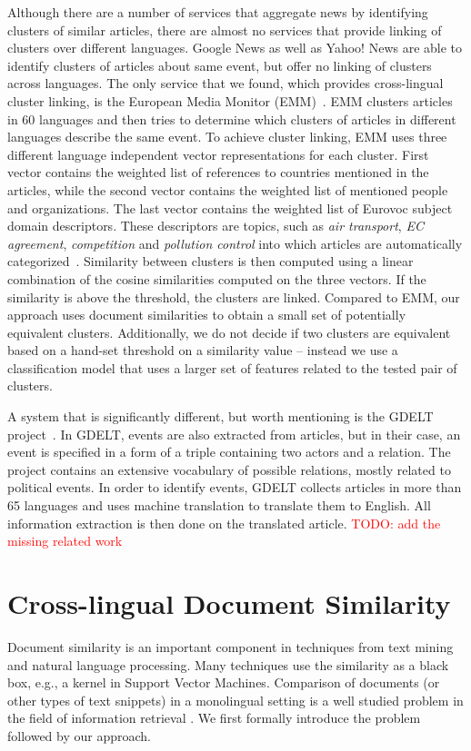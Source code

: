 \documentclass[twoside,11pt]{article}
\newcommand{\todo}[1]{\textcolor{red}{TODO: #1}}
\begin{document}
Although there are a number of services that aggregate news by identifying clusters of similar articles, there are almost no services that provide linking of clusters over different languages. Google News as well as Yahoo! News are able to identify clusters of articles about same event, but offer no linking of clusters across languages. The only service that we found, which provides cross-lingual cluster linking, is the European Media Monitor (EMM)~\cite{pouliquen2008story,Steinberger2008}. EMM clusters articles in 60 languages and then tries to determine which clusters of articles in different languages describe the same event. To achieve cluster linking, EMM uses three different language independent vector representations for each cluster. First vector contains the weighted list of references to countries mentioned in the articles, while the second vector contains the weighted list of mentioned people and organizations. The last vector contains the weighted list of Eurovoc subject domain descriptors. These descriptors are topics, such as \emph{air transport}, \emph{EC agreement}, \emph{competition} and \emph{pollution control} into which articles are automatically categorized~. Similarity between clusters is then computed using a linear combination of the cosine similarities computed on the three vectors. If the similarity is above the threshold, the clusters are linked. Compared to EMM, our approach uses document similarities to obtain a small set of potentially equivalent clusters. Additionally, we do not decide if two clusters are equivalent based on a hand-set threshold on a similarity value -- instead we use a classification model that uses a larger set of features related to the tested pair of clusters.

A system that is significantly different, but worth mentioning is the GDELT project~\cite{Leetaru2013Gdelt}. In GDELT, events are also extracted from articles, but in their case, an event is specified in a form of a triple containing two actors and a relation. The project contains an extensive vocabulary of possible relations, mostly related to political events. In order to identify events, GDELT collects articles in more than 65 languages and uses machine translation to translate them to English. All information extraction is then done on the translated article.
\todo{add the missing related work}


\section{Cross-lingual Document Similarity}
\label{sec:crosslingual}
Document similarity is an important component in techniques from text mining and natural language processing. Many techniques use the similarity as a black box, e.g., a kernel in Support Vector Machines. Comparison of documents (or other types of text snippets) in a monolingual setting is a well studied problem in the field of information retrieval \cite{Salton88term-weightingapproaches}. We first formally introduce the problem followed by our approach.
\end{document}
